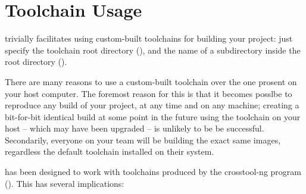 %
%
%
%
\chapter{Toolchain Usage}\label{chap:toolchain-usage}



\lmsbw trivially facilitates using custom-built toolchains for
building your project: just specify the toolchain root directory
(), and the name of a subdirectory
inside the root directory ().

There are many reasons to use a custom-built toolchain over the one
prosent on your host computer.  The foremost reason for this is that
it becomes posslbe to reproduce any build of your project, at any time
and on any machine; creating a bit-for-bit identical build at some
point in the future using the toolchain on your host -- which may have
been upgraded -- is unlikely to be be successful.  Secondarily,
everyone on your team will be building the exact same images,
regardless the default toolchain installed on their system.

\lmsbw has been designed to work with toolchains produced by the
crosstool-ng program ().  This has
several implications:

